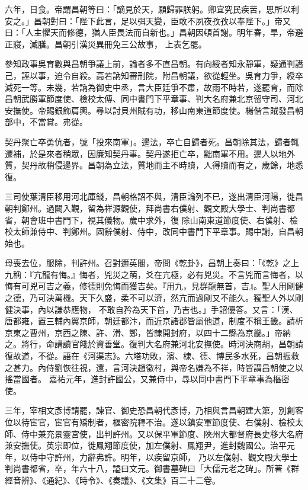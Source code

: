 \begin{pinyinscope}
 六年，日食。帝謂昌朝等曰：「謫見於天，願歸罪朕躬。卿宜究民疾苦，思所以利安之。」昌朝對曰：「陛下此言，足以弭天變，臣敢不夙夜孜孜以奉陛下。」帝又曰：「人主懼天而修德，猶人臣畏法而自新也。」昌朝因頓首謝。明年春，旱，帝避正寢，減膳。昌朝引漢災異冊免三公故事，
 上表乞罷。



 參知政事吳育數與昌朝爭議上前，論者多不直昌朝。有向綬者知永靜軍，疑通判譖己，誣以事，迫令自殺。高若訥知審刑院，附昌朝議，欲從輕坐。吳育力爭，綬卒減死一等。未幾，若訥為御史中丞，言大臣廷爭不肅，故雨不時若，遂罷育，而除昌朝武勝軍節度使、檢校太傅、同中書門下平章事、判大名府兼北京留守司、河北安撫使。帝賜銀飾肩輿。尋以討貝州賊有功，移山南東道節度使。楊偕言賊發昌朝部中，不當賞。弗從。



 契丹聚亡卒勇伉者，號「投來南軍」。邊法，卒亡自歸者死。昌朝除其法，歸者輒遷補，於是來者稍眾，因廉知契丹事。契丹遂拒亡卒，黜南軍不用。邊人以地外質，契丹故稍侵邊界。昌朝為立法，質地而主不時贖，人得贖而有之，歲餘，地悉復。



 三司使葉清臣移用河北庫錢，昌朝格詔不與，清臣論列不已，遂出清臣河陽，徙昌朝判鄭州。過闕入覲，留為祥源觀使，拜尚書右僕射、觀文殿大學士、判尚書都省，朝會班中書門下，視其儀物。歲中求外，復
 除山南東道節度使、右僕射、檢校太師兼侍中、判鄭州。固辭僕射、侍中，改同中書門下平章事。賜中謝，自昌朝始也。



 母喪去位，服除，判許州。召對邇英閣，帝問《乾卦》，昌朝上奏曰：「《乾》之上九稱：『亢龍有悔。』悔者，兇災之萌，爻在亢極，必有兇災。不言兇而言悔者，以悔有可兇可吉之義，修德則免悔而獲吉矣。『用九，見群龍無首，吉』。聖人用剛健之德，乃可決萬機。天下久盛，柔不可以濟，然亢而過剛又不能久。獨聖人外以剛健決事，內以謙恭應物，
 不敢自矜為天下首，乃吉也。」手詔優答。又言：「漢、唐都雍，置三輔內翼京師，朝廷都汴，而近京諸郡皆屬他道，制度不稱王畿。請析京東之曹州，京西之陳、許、滑、鄭，皆隸開封府，以四十二縣為京畿。」帝納之。將行，命講讀官餞於資善堂。復判大名府兼河北安撫使。時河決商胡，昌朝請復故道，不從。語在《河渠志》。六塔功敗，濱、棣、德、博民多水死，昌朝振救之甚力。內侍劉恢往視，還，言河決趙徵村，與帝名嫌為不祥，時皆謂昌朝使之以搖當國者。
 嘉祐元年，進封許國公，又兼侍中，尋以同中書門下平章事為樞密使。



 三年，宰相文彥博請罷，諫官、御史恐昌朝代彥博，乃相與言昌朝建大第，別創客位以待宦官，宦官有矯制者，樞密院釋不治。遂以鎮安軍節度使、右僕射、檢校太師、侍中兼充景靈宮使，出判許州。又以保平軍節度、陜州大都督府長史移大名府兼安撫使。英宗即位，徙鳳翔節度使，加左僕射、鳳翔尹，進封魏國公。治平元年，以侍中守許州，力辭弗許。明年，以疾留京師，
 乃以左僕射、觀文殿大學士判尚書都省，卒，年六十八，謚曰文元。御書墓碑曰「大儒元老之碑」。所著《群經音辨》、《通紀》、《時令》、《奏議》、《文集》百二十二卷。




\end{pinyinscope}
